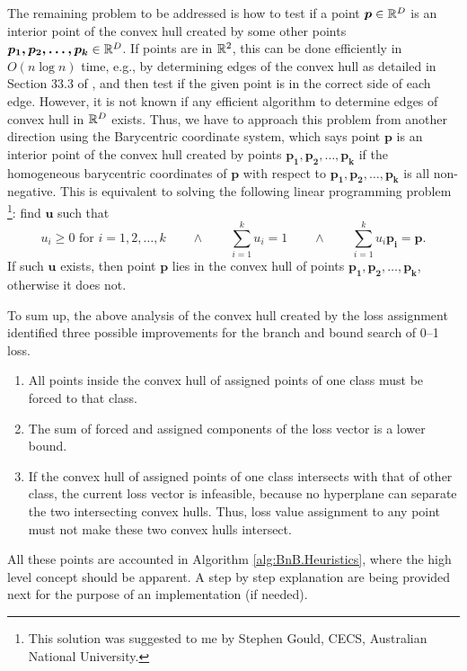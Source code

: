 The remaining problem to be addressed is how to test if a point $\boldsymbol{p} \in \mathbb{R}^D$ is an interior point of the convex hull created by some other points $\boldsymbol{p_1, p_2, \dots, p_k} \in \mathbb{R}^D$. If points are in $\mathbb{R}^2$, this can be done efficiently in $O(n \log n)$ time, e.g., by determining edges of the convex hull as detailed in Section 33.3 of \cite{cormen}, and then test if the given point is in the correct side of each edge. However, it is not known if any efficient algorithm to determine edges of convex hull in $\mathbb{R}^D$ exists. Thus, we have to approach this problem from another direction using the Barycentric coordinate system, which says point $\boldsymbol{p}$ is an interior point of the convex hull created by points $\boldsymbol{p_1, p_2, \dots, p_k}$ if the homogeneous barycentric coordinates of $\boldsymbol{p}$ with respect to $\boldsymbol{p_1, p_2, \dots, p_k}$ is all non-negative. This is equivalent to solving the following linear programming problem \footnote{This solution was suggested to me by Stephen Gould, CECS, Australian National University.}: find $\boldsymbol{u}$ such that 
$$
u_i \geq 0 \text{ for } i = 1,2, \dots, k \quad \quad \land \quad \quad
\sum_{i=1}^k u_i = 1 \quad \quad \land \quad \quad
\sum_{i=1}^k u_i \boldsymbol{p_i} = \boldsymbol{p}. 
$$
If such $\boldsymbol{u}$ exists, then point $\boldsymbol{p}$ lies in the convex hull of points $\boldsymbol{p_1, p_2, \dots, p_k}$, otherwise it does not. 

To sum up, the above analysis of the convex hull created by the loss assignment identified three possible improvements for the branch and bound search of 0--1 loss. 
\begin{enumerate}
\setlength{\itemsep}{0pt}
\setlength{\parskip}{0pt}
\item All points inside the convex hull of assigned points of one class must be forced to that class. 
\item The sum of forced and assigned components of the loss vector is a lower bound. 
\item If the convex hull of assigned points of one class intersects with that of other class, the current loss vector is infeasible, because no hyperplane can separate the two intersecting convex hulls. Thus, loss value assignment to any point must not make these two convex hulls intersect. 
\end{enumerate}
All these points are accounted in Algorithm \ref{alg:BnB.Heuristics}, where the high level concept should be apparent. A step by step explanation are being provided next for the purpose of an implementation (if needed).
 
